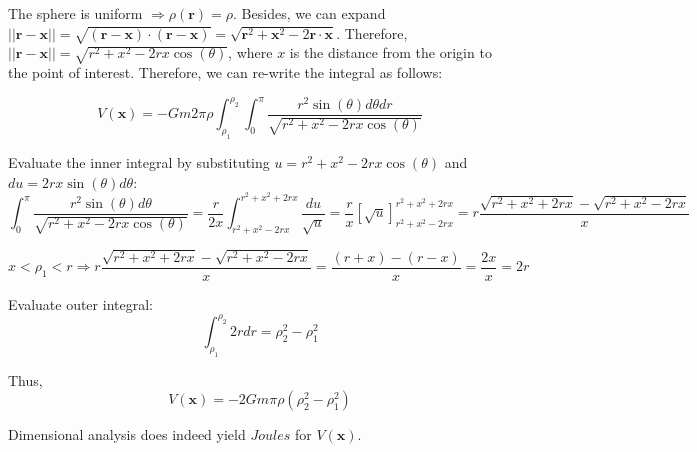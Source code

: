 \documentclass{article}
\begin{document}
The sphere is uniform $\Rightarrow \rho(\mathbf{r}) = \rho$. Besides, we can expand $||\mathbf{r} - \mathbf{x}|| = \sqrt{(\mathbf{r} - \mathbf{x}) \cdot (\mathbf{r} - \mathbf{x})} = \sqrt{ \mathbf{r}^2 + \mathbf{x}^2 - 2\mathbf{r} \cdot \mathbf{x} }$. Therefore, $||\mathbf{r} - \mathbf{x}|| = \sqrt{r^2 + x^2 - 2rx\cos(\theta)}$, where $x$ is the distance from the origin to the point of interest. Therefore, we can re-write the integral as follows:

\begin{equation*}
  V(\mathbf{x}) = -Gm2\pi\rho \int_{\rho_1}^{\rho_2} \int_0^\pi \frac{r^2\sin(\theta)d\theta dr}{\sqrt{r^2+x^2 - 2rx\cos(\theta)}}
\end{equation*}

Evaluate the inner integral by substituting $u = r^2 + x^2 - 2rx\cos(\theta)$ and $du = 2rx\sin(\theta) d\theta$:
\begin{equation*}
  \int_0^\pi \frac{r^2\sin(\theta)d\theta}{\sqrt{r^2+x^2 - 2rx\cos(\theta)}} = \frac{r}{2x} \int_{r^2+x^2-2rx}^{r^2+x^2+2rx} \frac{du}{\sqrt{u}} = \frac{r}{x} [\sqrt{u}]_{r^2+x^2-2rx}^{r^2+x^2+2rx} = r\frac{\sqrt{r^2+x^2+2rx} - \sqrt{r^2+x^2-2rx}}{x}
\end{equation*}

\begin{equation*}
  x < \rho_1 < r \Rightarrow r\frac{\sqrt{r^2+x^2+2rx} - \sqrt{r^2+x^2-2rx}}{x} = \frac{(r+x) - (r - x)}{x} = \frac{2x}{x} = 2r
\end{equation*}

Evaluate outer integral:
\begin{equation*}
  \int_{\rho_1}^{\rho_2} 2r dr = \rho_2^2 - \rho_1^2
\end{equation*}

Thus,
\begin{equation*}
  V(\mathbf{x}) = -2Gm\pi \rho (\rho_2^2 - \rho_1^2)
\end{equation*}

Dimensional analysis does indeed yield $Joules$ for $V(\mathbf{x})$.



  
\end{document}
